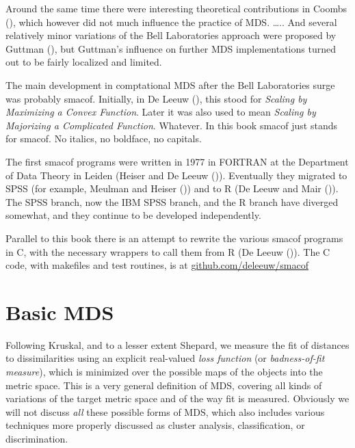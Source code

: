 \documentclass[
  12pt,
  letterpaper,
  DIV=11,
  numbers=noendperiod]{scrartcl}
\begin{document}
Around the same time there were interesting theoretical contributions in
Coombs (), which however did not much
influence the practice of MDS. \ldots.. And several relatively minor
variations of the Bell Laboratories approach were proposed by Guttman
(), but Guttman's influence on further
MDS implementations turned out to be fairly localized and limited.

The main development in comptational MDS after the Bell Laboratories
surge was probably smacof. Initially, in De Leeuw
(), this stood for \emph{Scaling by
Maximizing a Convex Function}. Later it was also used to mean
\emph{Scaling by Majorizing a Complicated Function}. Whatever. In this
book smacof just stands for smacof. No italics, no boldface, no
capitals.

The first smacof programs were written in 1977 in FORTRAN at the
Department of Data Theory in Leiden (Heiser and De Leeuw
()). Eventually they migrated to
SPSS (for example, Meulman and Heiser
()) and to R (De Leeuw and Mair
()). The SPSS branch, now the IBM
SPSS branch, and the R branch have diverged somewhat, and they continue
to be developed independently.

Parallel to this book there is an attempt to rewrite the various smacof
programs in C, with the necessary wrappers to call them from R (De Leeuw
()). The C code, with makefiles and
test routines, is at
\href{https://github.com/deleeuw/smacof}{github.com/deleeuw/smacof}

\section{Basic MDS}\label{introbasic}

Following Kruskal, and to a lesser extent Shepard, we measure the fit of
distances to dissimilarities using an explicit real-valued \emph{loss
function} (or \emph{badness-of-fit measure}), which is minimized over
the possible maps of the objects into the metric space. This is a very
general definition of MDS, covering all kinds of variations of the
target metric space and of the way fit is measured. Obviously we will
not discuss \emph{all} these possible forms of MDS, which also includes
various techniques more properly discussed as cluster analysis,
classification, or discrimination.
\end{document}
